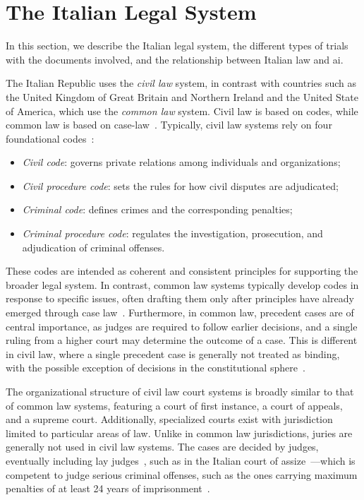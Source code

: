 \section{The Italian Legal System}
\label{sec:domains}
In this section, we describe the Italian legal system, the different types of trials with the documents involved, and the relationship between Italian law and \acl{ai}.

The Italian Republic uses the \emph{civil law} system, in contrast with countries such as the United Kingdom of Great Britain and Northern Ireland and the United State of America, which use the \emph{common law} system. Civil law is based on codes, while common law is based on case-law~\cite{Carlson2009}. 
Typically, civil law systems rely on four foundational codes~\cite{Carlson2009,apple1995primer}:
\begin{itemize}
    \item \emph{Civil code}: governs private relations among individuals and organizations;
    \item \emph{Civil procedure code}: sets the rules for how civil disputes are adjudicated;
    \item \emph{Criminal code}: defines crimes and the corresponding penalties;
    \item \emph{Criminal procedure code}: regulates the investigation, prosecution, and adjudication of criminal offenses.
\end{itemize}

These codes are intended as coherent and consistent principles for supporting the broader legal system. In contrast, common law systems typically develop codes in response to specific issues, often drafting them only after principles have already emerged through case law~\cite{Carlson2009}.
Furthermore, in common law, precedent cases are of central importance, as judges are required to follow earlier decisions, and a single ruling from a higher court may determine the outcome of a case. This is different in civil law, where a single precedent case is generally not treated as binding, with the possible exception of decisions in the constitutional sphere~\cite{Carlson2009}. 

The organizational structure of civil law court systems is broadly similar to that of common law systems, featuring a court of first instance, a court of appeals, and a supreme court. Additionally, specialized courts exist with jurisdiction limited to particular areas of law. Unlike in common law jurisdictions, juries are generally not used in civil law systems. The cases are decided by judges, eventually including lay judges~\cite{Carlson2009}, such as in the Italian court of assize~\cite[Art.~3]{legge10apr1951}---which is competent to judge serious criminal offenses, such as the ones carrying maximum penalties of at least 24 years of imprisonment~\cite[Art.~5]{CPP}.  

